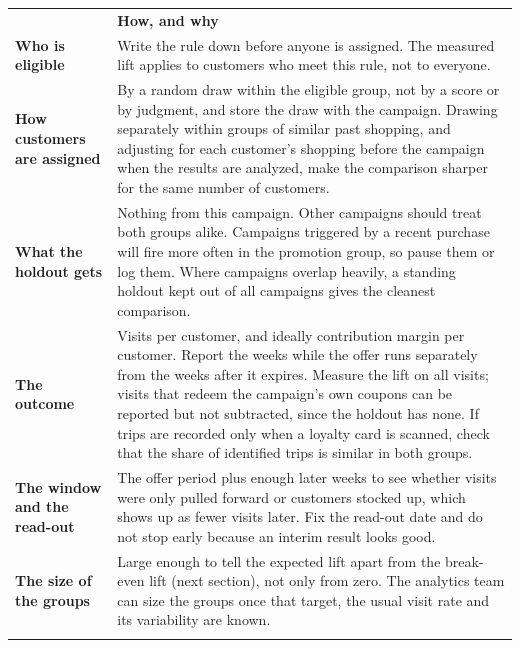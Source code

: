 \documentclass[11pt]{article}
\begin{document}
\vspace{-2pt}
{\small
\renewcommand{\arraystretch}{1.2}
\begin{xltabular}{\textwidth}{@{}L{3.1cm}Y@{}}
 & {\color{accent}\bfseries How, and why}\\
\midrule
\endhead
\textbf{Who is eligible} & Write the rule down before anyone is assigned. The measured lift
applies to customers who meet this rule, not to everyone. \\
\midrule
\textbf{How customers are assigned} & By a random draw within the eligible group, not by a
score or by judgment, and store the draw with the campaign. Drawing separately within groups of
similar past shopping, and adjusting for each customer's shopping before the campaign when the
results are analyzed, make the comparison sharper for the same number of customers. \\
\midrule
\textbf{What the holdout gets} & Nothing from this campaign. Other campaigns should treat both
groups alike. Campaigns triggered by a recent purchase will fire more often in the promotion
group, so pause them or log them. Where campaigns overlap heavily, a standing holdout kept out
of all campaigns gives the cleanest comparison. \\
\midrule
\textbf{The outcome} & Visits per customer, and ideally contribution margin per customer. Report
the weeks while the offer runs separately from the weeks after it expires. Measure the lift on
all visits; visits that redeem the campaign's own coupons can be reported but not subtracted,
since the holdout has none. If trips are recorded only when a loyalty card is scanned, check
that the share of identified trips is similar in both groups. \\
\midrule
\textbf{The window and the read-out} & The offer period plus enough later weeks to see whether
visits were only pulled forward or customers stocked up, which shows up as fewer visits later.
Fix the read-out date and do not stop early because an interim result looks good. \\
\midrule
\textbf{The size of the groups} & Large enough to tell the expected lift apart from the
break-even lift (next section), not only from zero. The analytics team can size the groups
once that target, the usual visit rate and its variability are known. \\
\bottomrule[0.6pt]
\end{xltabular}
}
\end{document}

